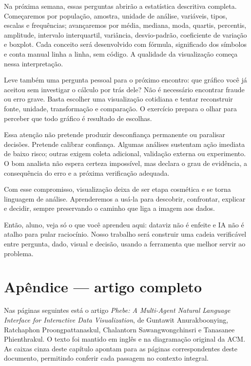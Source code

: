 Na próxima semana, essas perguntas abrirão a estatística descritiva completa. Começaremos por população, amostra, unidade de análise, variáveis, tipos, escalas e frequências; avançaremos por média, mediana, moda, quartis, percentis, amplitude, intervalo interquartil, variância, desvio-padrão, coeficiente de variação e boxplot. Cada conceito será desenvolvido com fórmula, significado dos símbolos e conta manual linha a linha, sem código. A qualidade da visualização começa nessa interpretação.

Leve também uma pergunta pessoal para o próximo encontro: que gráfico você já aceitou sem investigar o cálculo por trás dele? Não é necessário encontrar fraude ou erro grave. Basta escolher uma visualização cotidiana e tentar reconstruir fonte, unidade, transformação e comparação. O exercício prepara o olhar para perceber que todo gráfico é resultado de escolhas.

Essa atenção não pretende produzir desconfiança permanente ou paralisar decisões. Pretende calibrar confiança. Algumas análises sustentam ação imediata de baixo risco; outras exigem coleta adicional, validação externa ou experimento. O bom analista não espera certeza impossível, mas declara o grau de evidência, a consequência do erro e a próxima verificação adequada.

Com esse compromisso, visualização deixa de ser etapa cosmética e se torna linguagem de análise. Aprenderemos a usá-la para descobrir, confrontar, explicar e decidir, sempre preservando o caminho que liga a imagem aos dados.

\begin{SummaryBox}
Então, aluno, veja só o que você aprendeu aqui: dataviz não é enfeite e IA não é atalho para pular raciocínio. Nosso trabalho será construir uma cadeia verificável entre pergunta, dado, visual e decisão, usando a ferramenta que melhor servir ao problema.
\end{SummaryBox}

\clearpage
\chapter*{Apêndice --- artigo completo}

Nas páginas seguintes está o artigo \textit{Phebe: A Multi-Agent Natural Language Interface for Interactive Data Visualization}, de Guntawit Anurakboonying, Ratchaphon Proongpattanaskul, Chalantorn Sawangwongchinsri e Tanasanee Phienthrakul. O texto foi mantido em inglês e na diagramação original da ACM. As caixas cinza deste capítulo apontam para as páginas correspondentes deste documento, permitindo conferir cada passagem no contexto integral.

